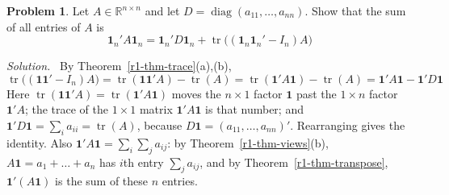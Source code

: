 \documentclass[12pt]{article}
\newcommand{\R}{\mathbb R}
\newcommand{\one}{\mathbf 1}
\DeclareMathOperator{\tr}{tr}
\DeclareMathOperator{\diag}{diag}
\theoremstyle{definition}
\newtheorem{problem}{Problem}
\newenvironment{solution}{\par\noindent\textit{Solution.}\ }{\par\smallskip}
\begin{document}
\begin{problem}\label{r1-ex-sum-entries}
Let \(A\in\R^{n\times n}\) and let \(D=\diag(a_{11},\dots,a_{nn})\). Show that the sum of all
entries of \(A\) is
\[
\one_n'A\one_n=\one_n'D\one_n+\tr\bigl((\one_n\one_n'-I_n)A\bigr)
\]
\end{problem}
\begin{solution}
By Theorem~\ref{r1-thm-trace}(a),(b),
\[
\tr\bigl((\one\one'-I_n)A\bigr)=\tr(\one\one'A)-\tr(A)=\tr(\one'A\one)-\tr(A)
=\one'A\one-\one'D\one
\]
Here \(\tr(\one\one'A)=\tr(\one'A\one)\) moves the \(n\times1\) factor \(\one\) past
the \(1\times n\) factor \(\one'A\); the trace of the \(1\times1\) matrix
\(\one'A\one\) is that number; and \(\one'D\one=\sum_ia_{ii}=\tr(A)\), because
\(D\one=(a_{11},\dots,a_{nn})'\). Rearranging gives the identity. Also
\(\one'A\one=\sum_i\sum_ja_{ij}\): by Theorem~\ref{r1-thm-views}(b),
\(A\one=a_1+\dots+a_n\) has \(i\)th entry \(\sum_ja_{ij}\), and by
Theorem~\ref{r1-thm-transpose}, \(\one'(A\one)\) is the sum of these \(n\) entries.
\end{solution}
\end{document}
